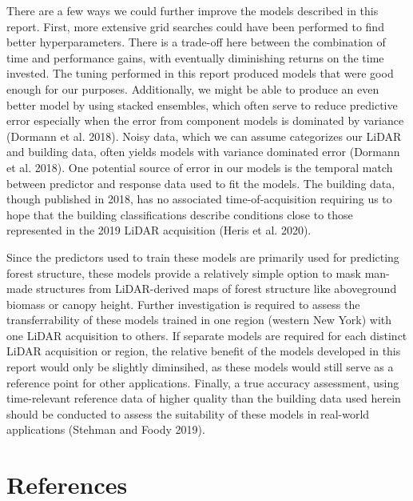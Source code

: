 \documentclass[review]{elsarticle} %
\begin{document}
There are a few ways we could further improve the models described in this
report.
First, more extensive grid searches could have been performed to find better
hyperparameters.
There is a trade-off here between the combination of time
and performance gains, with eventually diminishing returns on the time invested.
The tuning performed in this report produced models that were good enough for
our purposes.
Additionally, we might be able to produce an even better model by using
stacked ensembles, which often serve to reduce predictive error especially
when the error from component models is dominated by variance (Dormann et al. 2018).
Noisy data, which we can assume categorizes our LiDAR and building data, often
yields models with variance dominated error (Dormann et al. 2018).
One potential source of error in our models is the temporal match between
predictor and response data used to fit the models.
The building data, though published in 2018, has no associated
time-of-acquisition requiring us to hope that the building classifications
describe conditions close to those represented in the 2019 LiDAR acquisition
(Heris et al. 2020).

Since the predictors used to train these models are primarily used for
predicting forest structure, these models provide a relatively simple option
to mask man-made structures from LiDAR-derived maps of forest structure like
aboveground biomass or canopy height.
Further investigation is required to assess the transferrability of these models
trained in one region (western New York) with one LiDAR acquisition to others.
If separate models are required for each distinct LiDAR acquisition or region,
the relative benefit of the models developed in this report would only be
slightly diminsihed, as these models would still serve as a reference point for
other applications.
Finally, a true accuracy assessment, using time-relevant reference data of
higher quality than the building data used herein should be conducted to assess
the suitability of these models in real-world applications (Stehman and Foody 2019).

\newpage{}

\hypertarget{references}{%
\section*{References}\label{references}}
\end{document}
